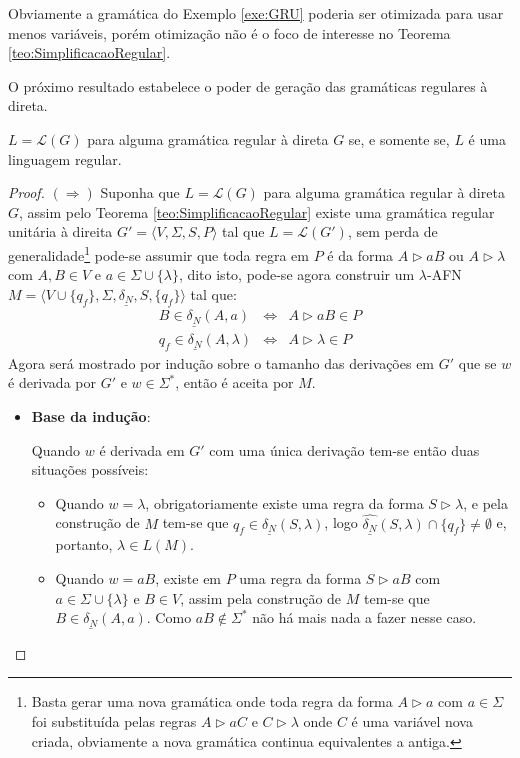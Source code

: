 \begin{remark}
	Obviamente a gramática do Exemplo \ref{exe:GRU} poderia ser otimizada para usar menos variáveis, porém otimização não é o foco de interesse no Teorema \ref{teo:SimplificacaoRegular}.
\end{remark} 

O próximo resultado estabelece o poder de geração das gramáticas regulares à direta.

\begin{theorem}\label{teo:GRD-AFD}
	$L = \mathcal{L}(G)$ para alguma gramática regular à direta $G$ se, e somente se, $L$ é uma linguagem regular.
\end{theorem}

\begin{proof}
	$(\Rightarrow)$ Suponha que $L = \mathcal{L}(G)$ para alguma gramática regular à direta $G$, assim pelo Teorema \ref{teo:SimplificacaoRegular} existe uma gramática regular unitária à direita $G' = \langle V, \Sigma, S, P \rangle$ tal que $L = \mathcal{L}(G')$, sem perda de generalidade\footnote{Basta gerar uma nova gramática onde toda regra da forma $A \rhd a$ com $a \in \Sigma$ foi substituída pelas regras $A \rhd aC$ e $C \rhd \lambda$ onde $C$ é uma variável nova criada, obviamente a nova gramática continua equivalentes a antiga.} pode-se assumir que toda regra em $P$ é da forma $A \rhd aB$ ou $A \rhd \lambda$ com $A, B \in V$ e $a \in \Sigma \cup \{\lambda\}$, dito isto, pode-se agora construir um $\lambda$-AFN $M = \langle V \cup \{q_f\}, \Sigma, \underline{\delta_N}, S, \{q_f\} \rangle$ tal que:
	\begin{eqnarray*}
		B \in \underline{\delta_N}(A, a) & \Longleftrightarrow & A \rhd aB \in P\\
		q_f \in \underline{\delta_N}(A, \lambda)& \Longleftrightarrow & A \rhd \lambda \in P
	\end{eqnarray*}
	Agora será mostrado por indução sobre o tamanho das derivações em $G'$ que se $w$ é derivada por $G'$ e $w \in \Sigma^*$, então é aceita por $M$.
	\begin{itemize}
		\item \textbf{Base da indução}:
		
		Quando $w$ é derivada em $G'$ com uma única derivação tem-se então duas situações possíveis:
		\begin{itemize}
			\item[(1)] Quando $w = \lambda$, obrigatoriamente existe uma regra da forma $S \rhd \lambda$, e pela construção de $M$ tem-se que $q_f \in \underline{\delta_N}(S, \lambda)$, logo $\widehat{\underline{\delta_N}}(S, \lambda) \cap \{q_f\} \neq \emptyset$ e, portanto, $\lambda \in L(M)$. 
			\item[(2)] Quando $w = aB$, existe em $P$ uma regra da forma $S \rhd aB$ com $a \in \Sigma \cup \{\lambda\}$ e $B \in V$, assim pela construção de $M$ tem-se que $B \in \underline{\delta_N}(A, a)$. Como $aB \notin \Sigma^*$ não há mais nada a fazer nesse caso.
		\end{itemize}
		

\end{itemize}
\end{proof}
